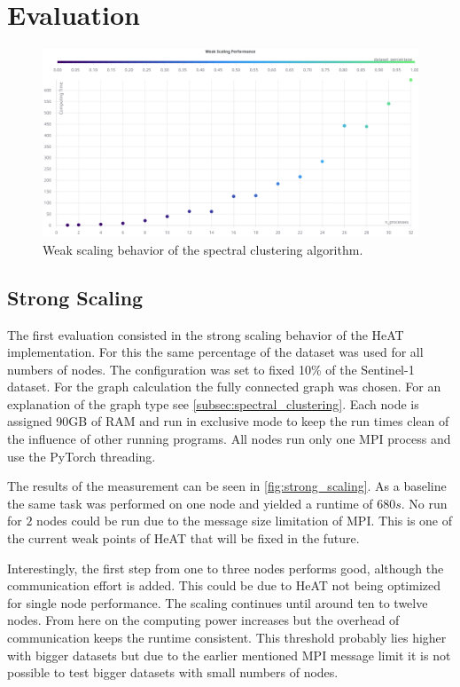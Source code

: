 \section{Evaluation}
\label{sec:evaluation}


\begin{figure}
  \centering
  \includegraphics[width=0.9\linewidth]{images/weak_scaling_chart.png}
  \caption{Weak scaling behavior of the spectral clustering algorithm.}\label{fig:weak_scaling}
\end{figure}


\subsection{Strong Scaling}
\label{subsec:strong_scaling}


The first evaluation consisted in the strong scaling behavior of the \gls{HeAT} implementation.
For this the same percentage of the dataset was used for all numbers of nodes.
The configuration was set to fixed 10\% of the Sentinel-1 dataset.
For the graph calculation the fully connected graph was chosen. For an explanation of the graph type see \cref{subsec:spectral_clustering}.
Each node is assigned 90GB of \gls{RAM} and run in exclusive mode to keep the run times clean of the influence of other running programs.
All nodes run only one \gls{MPI} process and use the \gls{PyTorch} threading.

The results of the measurement can be seen in \cref{fig:strong_scaling}. As a baseline the same task was performed on one node and yielded a runtime of \(680s\).
No run for \(2\) nodes could be run due to the message size limitation of \gls{MPI}. This is one of the current weak points
of \gls{HeAT} that will be fixed in the future.

Interestingly, the first step from one to three nodes performs good, although the communication effort is added.
This could be due to \gls{HeAT} not being optimized for single node performance.
The scaling continues until around ten to twelve nodes.
From here on the computing power increases but the overhead of communication keeps the runtime consistent.
This threshold probably lies higher with bigger datasets but due to the earlier mentioned \gls{MPI} message limit it is not possible to test
bigger datasets with small numbers of nodes.

